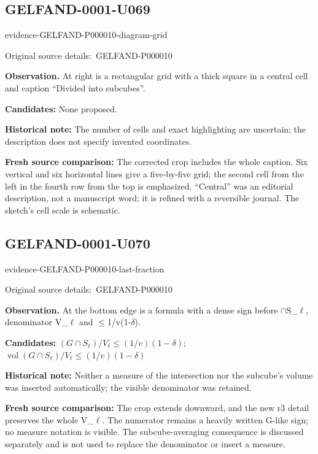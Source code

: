 \documentclass[11pt]{article}
\newcommand{\EvidenceBlock}[4]{%
 \par\smallskip\noindent\begin{minipage}{\linewidth}
 \begin{minipage}[t]{.47\linewidth}\vspace{0pt}\centering
 \csname evidence-#1-#2\endcsname\par
 {\scriptsize\SourceCropCaption\ #1}\par
 \end{minipage}\hfill
 \begin{minipage}[t]{.49\linewidth}\vspace{0pt}\raggedright
 {\small\color{orange!65!black}\textbf{#4} #3}\par
 \end{minipage}
 \end{minipage}\par\smallskip}
\newcommand{\SourceCropCaption}{Original source details:}\newcommand{\ReadingCaption}{Uncertain reading.}\newcommand{\IncompleteCaption}{Undeciphered passage.}\newcommand{\DiagramCaption}{Diagram and typed description.}
\begin{document}
\subsection*{GELFAND-0001-U069}
\EvidenceBlock{GELFAND-P000010}{diagram-grid}{At right is a rectangular grid with a thick square in a central cell and caption “Divided into subcubes”.}{Observation.}
\par\smallskip\noindent\textbf{Candidates: } None proposed.\par
\par\smallskip\noindent\textbf{Historical note: } The number of cells and exact highlighting are uncertain; the description does not specify invented coordinates.\par
\par\smallskip\noindent\textbf{Fresh source comparison: } The corrected crop includes the whole caption. Six vertical and six horizontal lines give a five-by-five grid; the second cell from the left in the fourth row from the top is emphasized. “Central” was an editorial description, not a manuscript word; it is refined with a reversible journal. The sketch’s cell scale is schematic.\par

\subsection*{GELFAND-0001-U070}
\EvidenceBlock{GELFAND-P000010}{last-fraction}{At the bottom edge is a formula with a dense sign before \(\cap\)S\_\(\ell\), denominator V\_\(\ell\) and \(\le\)1/v(1-\(\delta\)).}{Observation.}
\par\smallskip\noindent\textbf{Candidates: } \((G\cap S_\ell)/V_\ell\le(1/v)(1-\delta)\); \(\operatorname{vol}(G\cap S_\ell)/V_\ell\le(1/v)(1-\delta)\)\par
\par\smallskip\noindent\textbf{Historical note: } Neither a measure of the intersection nor the subcube’s volume was inserted automatically; the visible denominator was retained.\par
\par\smallskip\noindent\textbf{Fresh source comparison: } The crop extends downward, and the new r3 detail preserves the whole V\_\(\ell\). The numerator remains a heavily written G-like sign; no measure notation is visible. The subcube-averaging consequence is discussed separately and is not used to replace the denominator or insert a measure.\par
\end{document}
